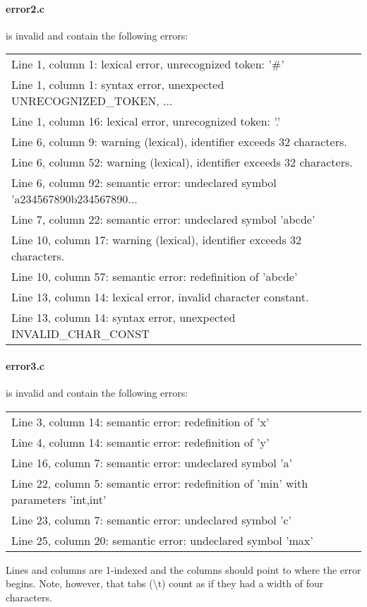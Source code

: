 \paragraph{error2.c} is invalid and contain the following errors:

\begin{tabular}{l}
Line 1, column 1: lexical error, unrecognized token: '\#' \\
Line 1, column 1: syntax error, unexpected UNRECOGNIZED\_TOKEN, ... \\
Line 1, column 16: lexical error, unrecognized token: '.' \\
Line 6, column 9: warning (lexical), identifier exceeds 32 characters. \\
Line 6, column 52: warning (lexical), identifier exceeds 32 characters. \\
Line 6, column 92: semantic error: undeclared symbol 'a234567890b234567890... \\
Line 7, column 22: semantic error: undeclared symbol 'abcde' \\
Line 10, column 17: warning (lexical), identifier exceeds 32 characters. \\
Line 10, column 57: semantic error: redefinition of 'abcde' \\
Line 13, column 14: lexical error, invalid character constant. \\
Line 13, column 14: syntax error, unexpected INVALID\_CHAR\_CONST \\
\end{tabular}


\paragraph{error3.c} is invalid and contain the following errors:

\begin{tabular}{l}
Line 3, column 14: semantic error: redefinition of 'x' \\
Line 4, column 14: semantic error: redefinition of 'y' \\
Line 16, column 7: semantic error: undeclared symbol 'a' \\
Line 22, column 5: semantic error: redefinition of 'min' with parameters 'int,int' \\
Line 23, column 7: semantic error: undeclared symbol 'c' \\
Line 25, column 20: semantic error: undeclared symbol 'max' \\
\end{tabular}


Lines and columns are 1-indexed and the columns should point to where the error begins.
Note, however, that tabs (\textbackslash t) count as if they had a width of four characters.
